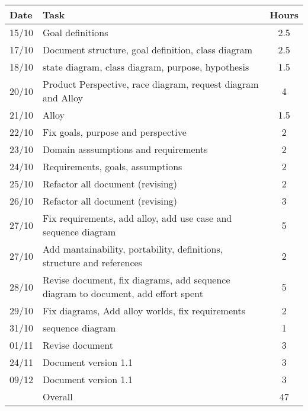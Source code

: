\begin{table}[H]
\begin{tabularx}{\textwidth}{|l|X|c|}
\hline
\rowcolor[HTML]{C0C0C0} 
Date & Task & Hours\\ \hline
15/10 & Goal definitions & 2.5\\ \hline
17/10 & Document structure, goal definition, class diagram & 2.5\\ \hline
18/10 & state diagram, class diagram, purpose, hypothesis & 1.5\\ \hline
20/10 & Product Perspective, race diagram, request diagram and Alloy & 4\\ \hline
21/10 & Alloy & 1.5 \\ \hline
22/10 & Fix goals, purpose and perspective & 2\\ \hline
23/10 & Domain asssumptions and requirements & 2\\ \hline
24/10 & Requirements, goals, assumptions & 2\\ \hline
25/10 & Refactor all document (revising) & 2\\ \hline
26/10 & Refactor all document (revising) & 3\\ \hline
27/10 & Fix requirements, add alloy, add use case and sequence diagram & 5\\ \hline
27/10 & Add mantainability, portability, definitions, structure and references & 2\\ \hline
28/10 & Revise document, fix diagrams, add sequence diagram to document, add effort spent & 5\\ \hline
29/10 & Fix diagrams, Add alloy worlds, fix requirements & 2 \\ \hline
31/10 & sequence diagram & 1 \\ \hline
01/11 & Revise document & 3 \\ \hline 
24/11 & Document version 1.1 & 3\\ \hline
09/12 & Document version 1.1 & 3\\ \hline
\rowcolor[HTML]{C0C0C0} 
& Overall & 47\\ \hline
\end{tabularx}
\end{table}